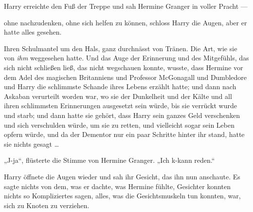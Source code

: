 Harry erreichte den Fuß der Treppe und sah Hermine Granger in voller Pracht —

ohne nachzudenken, ohne sich helfen zu können, schloss Harry die Augen, aber er hatte alles gesehen.



Ihren Schulmantel um den Hals, ganz durchnässt von Tränen. Die Art, wie sie von \emph{ihm} weggesehen hatte. Und das Auge der Erinnerung und des Mitgefühls, das sich nicht schließen ließ, das nicht wegschauen konnte, wusste, dass Hermine vor dem Adel des magischen Britanniens und Professor McGonagall und Dumbledore und Harry die schlimmste Schande ihres Lebens erzählt hatte; und dann nach Askaban verurteilt worden war, wo sie der Dunkelheit und der Kälte und all ihren schlimmsten Erinnerungen ausgesetzt sein würde, bis sie verrückt wurde und starb; und dann hatte sie gehört, dass Harry sein ganzes Geld verschenken und sich verschulden würde, um sie zu retten, und vielleicht sogar sein Leben opfern würde, und da der Dementor nur ein paar Schritte hinter ihr stand, hatte sie nichts gesagt …

„J-ja“, flüsterte die Stimme von Hermine Granger.
„Ich k-kann reden.“

Harry öffnete die Augen wieder und sah ihr Gesicht, das ihn nun anschaute. Es sagte nichts von dem, was er dachte, was Hermine fühlte, Gesichter konnten nichts so Kompliziertes sagen, alles, was die Gesichtsmuskeln tun konnten, war, sich zu Knoten zu verziehen.


